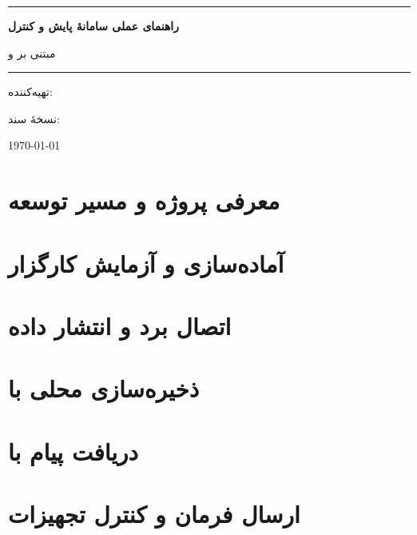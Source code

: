 \documentclass[12pt,a4paper,oneside]{report}
\begin{document}
\begin{titlepage}
\begin{center}
  \vspace*{25mm}
  {\color{Primary}\rule{\textwidth}{1.2pt}\par}
  \vspace{12mm}
  {\Huge\bfseries راهنمای عملی سامانهٔ پایش و کنترل\par}
  \vspace{5mm}
  {\LARGE مبتنی بر
  و
  \par}
  \vspace{12mm}
  {\color{Primary}\rule{\textwidth}{1.2pt}\par}
  \vfill
  {\large تهیه‌کننده: \ProjectAuthor\par}
  \vspace{3mm}
  {\large نسخهٔ سند: \ReportVersion\par}
  \vspace{12mm}
  {\large \today\par}
\end{center}
\end{titlepage}

\tableofcontents
\clearpage
{}

\chapter{معرفی پروژه و مسیر توسعه}


\chapter{آماده‌سازی و آزمایش کارگزار}


\chapter{اتصال برد و انتشار داده}


\chapter{ذخیره‌سازی محلی با
}


\chapter{دریافت پیام با
}


\chapter{ارسال فرمان و کنترل تجهیزات}

\end{document}
